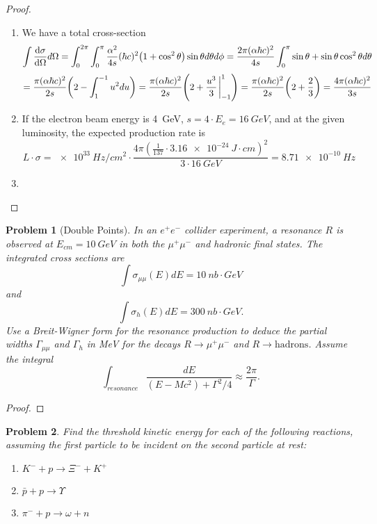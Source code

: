 \documentclass{article}
\newtheorem{plm}{Problem}
\begin{document}
\begin{proof} \;
  \begin{enumerate}
  \item We have a total cross-section
    \[
      \int \dv{\sigma}{\Omega} d\Omega = \int_{0}^{2\pi}\int_{0}^{\pi}\frac{\alpha^{2}}{4s}(\hbar c)^{2}\qty(1 + \cos^{2}\theta)\sin\theta
      d\theta d\phi
      = \frac{2\pi(\alpha\hbar c)^{2}}{4s}\int_{0}^{\pi}\sin\theta + \sin\theta\cos^{2}\theta d\theta
    \]
    \[
      = \frac{\pi(\alpha\hbar c)^{2}}{2s}\qty(2 - \int_{1}^{-1}u^{2}du)
      = \frac{\pi(\alpha\hbar c)^{2}}{2s}\qty(2 + \frac{u^{3}}{3}\eval_{-1}^{1})
      = \frac{\pi(\alpha\hbar c)^{2}}{2s}\qty(2 + \frac{2}{3})
      = \frac{4\pi(\alpha\hbar c)^{2}}{3s}
    \]
  \item If the electron beam energy is \SI{4}{GeV}, $s = 4 \cdot E_{e} = \SI{16}{GeV}$, and at the given luminosity,
    the expected production rate is
    \[
      L \cdot \sigma = \SI{e33}{Hz/cm^{2}} \cdot \frac{4\pi(\frac{1}{137} \cdot \SI{3.16e-24}{J \cdot cm})^{2}}{3 \cdot \SI{16}{GeV}}
      = \SI{8.71e-10}{Hz}
    \]
  \item %
  \end{enumerate}
\end{proof}

\begin{plm}[Double Points]
  In an $e^{+}e^{-}$ collider experiment, a resonance $R$ is observed at $E_{cm} = \SI{10}{GeV}$ in both the $\mu^{+}\mu^{-}$
  and hadronic final states.
  The integrated cross sections are
  \[
    \int \sigma_{\mu \mu}(E)dE = \SI{10}{nb \cdot GeV}
  \]
  and
  \[
    \int \sigma_{h}(E)dE = \SI{300}{nb \cdot GeV}.
  \]
  Use a Breit-Wigner form for the resonance production to deduce the partial widths $\Gamma_{\mu\mu}$ and $\Gamma_{h}$ in \si{MeV}
  for the decays $R \to \mu^{+}\mu^{-}$ and $R \to \text{hadrons}$.
  Assume the integral
  \[
    \int_{resonance}\frac{dE}{(E - Mc^{2}) + \Gamma^{2}/4} \approx \frac{2\pi}{\Gamma}.
  \]
\end{plm}

\begin{proof}

\end{proof}

\begin{plm}
  Find the threshold kinetic energy for each of the following reactions, assuming the first particle to be incident on the second particle
  at rest:
  \begin{enumerate}
  \item $K^{-} + p \to \Xi^{-} + K^{+}$
  \item $\bar{p} + p \to \Upsilon$
  \item $\pi^{-} + p \to \omega + n$
  \end{enumerate}
\end{plm}
\end{document}
